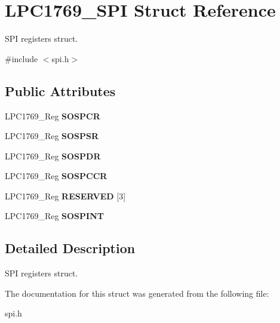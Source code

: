 \hypertarget{struct_l_p_c1769___s_p_i}{\section{L\+P\+C1769\+\_\+\+S\+P\+I Struct Reference}
\label{struct_l_p_c1769___s_p_i}
}


S\+P\+I registers struct.  




{\ttfamily \#include $<$spi.\+h$>$}

\subsection*{Public Attributes}
\begin{DoxyCompactItemize}
\item 
\hypertarget{struct_l_p_c1769___s_p_i_a85e0a76193de6acefdd59c7e12fea01b}{L\+P\+C1769\+\_\+\+Reg {\bfseries S\+O\+S\+P\+C\+R}}\label{struct_l_p_c1769___s_p_i_a85e0a76193de6acefdd59c7e12fea01b}

\item 
\hypertarget{struct_l_p_c1769___s_p_i_a78e83e4f4b3a802d7d8e8bdb0084e34e}{L\+P\+C1769\+\_\+\+Reg {\bfseries S\+O\+S\+P\+S\+R}}\label{struct_l_p_c1769___s_p_i_a78e83e4f4b3a802d7d8e8bdb0084e34e}

\item 
\hypertarget{struct_l_p_c1769___s_p_i_a0968da56c14882a210209f991786e234}{L\+P\+C1769\+\_\+\+Reg {\bfseries S\+O\+S\+P\+D\+R}}\label{struct_l_p_c1769___s_p_i_a0968da56c14882a210209f991786e234}

\item 
\hypertarget{struct_l_p_c1769___s_p_i_a493faa0849f1faf61acda5d564e7d5e3}{L\+P\+C1769\+\_\+\+Reg {\bfseries S\+O\+S\+P\+C\+C\+R}}\label{struct_l_p_c1769___s_p_i_a493faa0849f1faf61acda5d564e7d5e3}

\item 
\hypertarget{struct_l_p_c1769___s_p_i_a39c2089a674b039099164d83c639d9be}{L\+P\+C1769\+\_\+\+Reg {\bfseries R\+E\+S\+E\+R\+V\+E\+D} \mbox{[}3\mbox{]}}\label{struct_l_p_c1769___s_p_i_a39c2089a674b039099164d83c639d9be}

\item 
\hypertarget{struct_l_p_c1769___s_p_i_a76ff4fbae813b8651d23a15206d994f3}{L\+P\+C1769\+\_\+\+Reg {\bfseries S\+O\+S\+P\+I\+N\+T}}\label{struct_l_p_c1769___s_p_i_a76ff4fbae813b8651d23a15206d994f3}

\end{DoxyCompactItemize}


\subsection{Detailed Description}
S\+P\+I registers struct. 

The documentation for this struct was generated from the following file\+:\begin{DoxyCompactItemize}
\item 
spi.\+h\end{DoxyCompactItemize}
